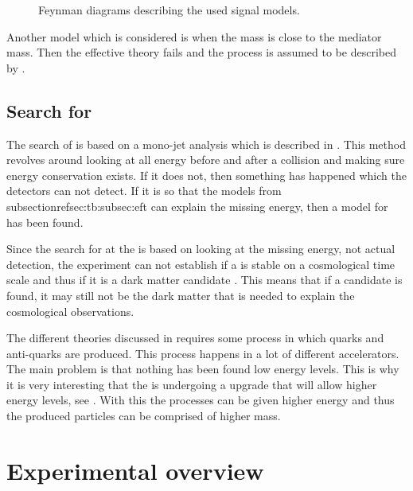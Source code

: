  \begin{figure}[H] %
    \hfill
    \caption{Feynman diagrams describing the used signal models.}
    \label{fig:opfeyn}
  \end{figure}
Another model which is considered is when the \abbrWIMP mass is close to the mediator mass. Then the effective theory fails and the process is assumed to be described by . 

\subsection{Search for \abbrWIMPS}\label{sec:tb:subsec:WIMPS}
The search of \abbrWIMPS is based on a mono-jet analysis which is described in . This method revolves around looking at all energy before and after a collision and making sure energy conservation exists. If it does not, then something has happened which the detectors can not detect. If it is so that the models from subsectionref{sec:tb:subsec:eft} can explain the missing energy, then a model for \abbrWIMPS has been found. 

Since the search for \abbrWIMPS at the \abbrLHC is based on looking at the missing energy, not actual detection, the experiment can not establish if a \abbrWIMP is stable on a cosmological time scale and thus if it is a dark matter candidate \citep{CERN-PH-EP-2012-210}. This means that if a candidate is found, it may still not be the dark matter that is needed to explain the cosmological observations.

The different theories discussed in  requires some process in which quarks and anti-quarks are produced. This process happens in a lot of different accelerators. The main problem is that nothing has been found low energy levels. This is why it is very interesting that the \abbrLHC is undergoing a upgrade that will allow higher energy levels, see . With this the processes can be given higher energy and thus the produced particles can be comprised of higher mass. 
\newpage
\section{Experimental overview}\label{sec:experiment}
